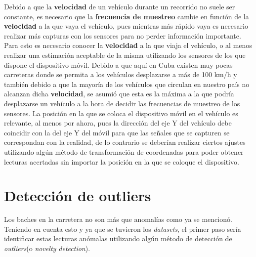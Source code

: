 	Debido a que la \textbf{velocidad} de un vehículo durante un recorrido no suele ser constante, es necesario
	que la \textbf{frecuencia de muestreo} cambie en función de la \textbf{velocidad} a la que vaya el vehículo,
	pues mientras más rápido vaya es necesario realizar más capturas con los sensores para no perder información
	importante. Para esto es necesario conocer la \textbf{velocidad} a la que viaja el vehículo, o al menos
	realizar una estimación aceptable de la misma utilizando los sensores de los que dispone el dispositivo móvil.
	Debido a que aquí en Cuba existen muy pocas carreteras donde se permita a los vehículos desplazarse a más de
	100 km/h y también debido a que la mayoría de los vehículos que circulan en nuestro país no alcanzan dicha
	\textbf{velocidad}, se asumió que esta es la máxima a la que podría desplazarse un vehículo a la hora de decidir
	las frecuencias de muestreo de los sensores. La posición en la que se coloca el dispositivo móvil en el vehículo
	es relevante, al menos por ahora, pues la dirección del eje Y del vehículo debe coincidir con la del eje Y del
	móvil para que las señales que se capturen se correspondan con la realidad, de lo contrario se deberían realizar
	ciertos ajustes utilizando algún método de transformación de coordenadas para poder obtener lecturas acertadas
	sin importar la posición en la que se coloque el dispositivo.

\section*{Detección de outliers}
	Los baches en la carretera no son más que anomalías como ya se mencionó. Teniendo en cuenta esto y ya que se tuvieron 
	los \emph{datasets}, el primer paso sería identificar estas lecturas anómalas utilizando algún método de detección de
	\emph{outliers}(o \emph{novelty detection}).
